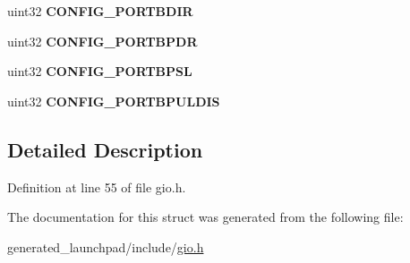 \begin{DoxyCompactItemize}
\item 
\mbox{\label{structgio__config__reg_ab40843c053a62c0a11499d9bdeec47db}} 
uint32 {\bfseries C\+O\+N\+F\+I\+G\+\_\+\+P\+O\+R\+T\+B\+D\+IR}
\item 
\mbox{\label{structgio__config__reg_adbfd6af4ce900fef95aafa9debdeb9bb}} 
uint32 {\bfseries C\+O\+N\+F\+I\+G\+\_\+\+P\+O\+R\+T\+B\+P\+DR}
\item 
\mbox{\label{structgio__config__reg_ace2b4519a0b67136138c0989d6489143}} 
uint32 {\bfseries C\+O\+N\+F\+I\+G\+\_\+\+P\+O\+R\+T\+B\+P\+SL}
\item 
\mbox{\label{structgio__config__reg_a8f3da09c2592fb511695fcf67201fd52}} 
uint32 {\bfseries C\+O\+N\+F\+I\+G\+\_\+\+P\+O\+R\+T\+B\+P\+U\+L\+D\+IS}
\end{DoxyCompactItemize}


\subsection{Detailed Description}


Definition at line 55 of file gio.\+h.



The documentation for this struct was generated from the following file\+:\begin{DoxyCompactItemize}
\item 
generated\+\_\+launchpad/include/\mbox{\hyperlink{gio_8h}{gio.\+h}}\end{DoxyCompactItemize}
